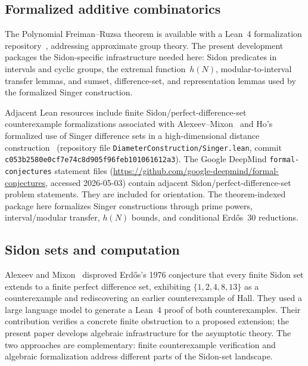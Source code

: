 \documentclass[11pt,a4paper]{article}
\begin{document}
\subsection{Formalized additive combinatorics}

The Polynomial Freiman--Ruzsa theorem is available with a Lean~4
formalization repository~\cite{PFR2024}, addressing approximate group theory.
The present development packages the Sidon-specific infrastructure needed here:
Sidon predicates in intervals and cyclic groups, the extremal function~\(h(N)\),
modular-to-interval transfer lemmas, and sumset, difference-set, and
representation lemmas used by the formalized Singer construction.

Adjacent Lean resources include finite Sidon/perfect-difference-set
counterexample formalizations associated with Alexeev--Mixon~\cite{AlexeevMixon2026}
and Ho's formalized use of Singer difference sets in a high-dimensional
distance construction~\cite{Ho2026} (repository file
\texttt{DiameterConstruction/Singer.lean}, commit
\texttt{c053b2580e0cf7e74c8d905f96feb101061612a3}).
The Google DeepMind \texttt{formal-conjectures} statement files
(\url{https://github.com/google-deepmind/formal-conjectures}, accessed
2026-05-03) contain adjacent Sidon/perfect-difference-set problem statements.
They are included for orientation.  The theorem-indexed package here formalizes
Singer constructions through prime powers, interval/modular transfer,
\(h(N)\) bounds, and conditional Erd\H{o}s~30 reductions.

\subsection{Sidon sets and computation}

Alexeev and Mixon~\cite{AlexeevMixon2026} disproved Erd\H{o}s's 1976
conjecture that every finite Sidon set extends to a finite perfect
difference set, exhibiting $\{1, 2, 4, 8, 13\}$ as a counterexample
and rediscovering an earlier counterexample of Hall.  They used a large
language model to generate a Lean~4 proof of both counterexamples.  Their
contribution verifies a concrete finite obstruction to a proposed extension;
the present paper develops algebraic infrastructure for the asymptotic theory.
The two approaches are complementary: finite counterexample verification and
algebraic formalization address different parts of the Sidon-set landscape.
\end{document}
